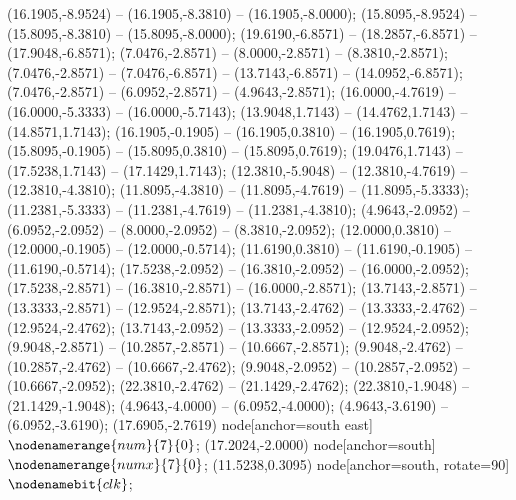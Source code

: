    (16.1905,-8.9524) -- (16.1905,-8.3810) -- (16.1905,-8.0000);
   (15.8095,-8.9524) -- (15.8095,-8.3810) -- (15.8095,-8.0000);
   (19.6190,-6.8571) -- (18.2857,-6.8571) -- (17.9048,-6.8571);
   (7.0476,-2.8571) -- (8.0000,-2.8571) -- (8.3810,-2.8571);
   (7.0476,-2.8571) -- (7.0476,-6.8571) -- (13.7143,-6.8571) -- (14.0952,-6.8571);
   (7.0476,-2.8571) -- (6.0952,-2.8571) -- (4.9643,-2.8571);
   (16.0000,-4.7619) -- (16.0000,-5.3333) -- (16.0000,-5.7143);
   (13.9048,1.7143) -- (14.4762,1.7143) -- (14.8571,1.7143);
   (16.1905,-0.1905) -- (16.1905,0.3810) -- (16.1905,0.7619);
   (15.8095,-0.1905) -- (15.8095,0.3810) -- (15.8095,0.7619);
   (19.0476,1.7143) -- (17.5238,1.7143) -- (17.1429,1.7143);
   (12.3810,-5.9048) -- (12.3810,-4.7619) -- (12.3810,-4.3810);
   (11.8095,-4.3810) -- (11.8095,-4.7619) -- (11.8095,-5.3333);
   (11.2381,-5.3333) -- (11.2381,-4.7619) -- (11.2381,-4.3810);
   (4.9643,-2.0952) -- (6.0952,-2.0952) -- (8.0000,-2.0952) -- (8.3810,-2.0952);
   (12.0000,0.3810) -- (12.0000,-0.1905) -- (12.0000,-0.5714);
   (11.6190,0.3810) -- (11.6190,-0.1905) -- (11.6190,-0.5714);
   (17.5238,-2.0952) -- (16.3810,-2.0952) -- (16.0000,-2.0952);
   (17.5238,-2.8571) -- (16.3810,-2.8571) -- (16.0000,-2.8571);
   (13.7143,-2.8571) -- (13.3333,-2.8571) -- (12.9524,-2.8571);
   (13.7143,-2.4762) -- (13.3333,-2.4762) -- (12.9524,-2.4762);
   (13.7143,-2.0952) -- (13.3333,-2.0952) -- (12.9524,-2.0952);
   (9.9048,-2.8571) -- (10.2857,-2.8571) -- (10.6667,-2.8571);
   (9.9048,-2.4762) -- (10.2857,-2.4762) -- (10.6667,-2.4762);
   (9.9048,-2.0952) -- (10.2857,-2.0952) -- (10.6667,-2.0952);
   (22.3810,-2.4762) -- (21.1429,-2.4762);
   (22.3810,-1.9048) -- (21.1429,-1.9048);
   (4.9643,-4.0000) -- (6.0952,-4.0000);
   (4.9643,-3.6190) -- (6.0952,-3.6190);
   (17.6905,-2.7619) node[anchor=south east] {$\nodenamerange{num}{7}{0}$};
   (17.2024,-2.0000) node[anchor=south] {$\nodenamerange{numx}{7}{0}$};
   (11.5238,0.3095) node[anchor=south, rotate=90] {$\nodenamebit{clk}$};
